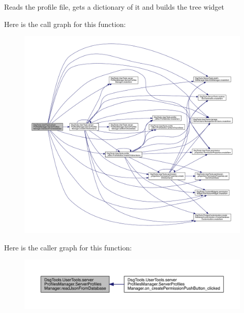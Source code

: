 \begin{DoxyVerb}Reads the profile file, gets a dictionary of it and builds the tree widget
\end{DoxyVerb}
 Here is the call graph for this function\+:
\nopagebreak
\begin{figure}[H]
\begin{center}
\leavevmode
\includegraphics[width=350pt]{class_dsg_tools_1_1_user_tools_1_1server_profiles_manager_1_1_server_profiles_manager_a55aa853f110f1aa87039275c0380d8d7_cgraph}
\end{center}
\end{figure}
Here is the caller graph for this function\+:
\nopagebreak
\begin{figure}[H]
\begin{center}
\leavevmode
\includegraphics[width=350pt]{class_dsg_tools_1_1_user_tools_1_1server_profiles_manager_1_1_server_profiles_manager_a55aa853f110f1aa87039275c0380d8d7_icgraph}
\end{center}
\end{figure}
\mbox{\label{class_dsg_tools_1_1_user_tools_1_1server_profiles_manager_1_1_server_profiles_manager_a9f7d36e48d6eb2493d1e091cd9656658}} 
